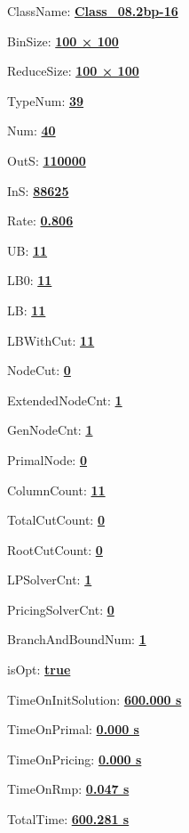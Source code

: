\documentclass[11pt]{article}
\begin{document}
\pagestyle{empty}


ClassName: \underline{\textbf{Class_08.2bp-16}}
\par
BinSize: \underline{\textbf{100 × 100}}
\par
ReduceSize: \underline{\textbf{100 × 100}}
\par
TypeNum: \underline{\textbf{39}}
\par
Num: \underline{\textbf{40}}
\par
OutS: \underline{\textbf{110000}}
\par
InS: \underline{\textbf{88625}}
\par
Rate: \underline{\textbf{0.806}}
\par
UB: \underline{\textbf{11}}
\par
LB0: \underline{\textbf{11}}
\par
LB: \underline{\textbf{11}}
\par
LBWithCut: \underline{\textbf{11}}
\par
NodeCut: \underline{\textbf{0}}
\par
ExtendedNodeCnt: \underline{\textbf{1}}
\par
GenNodeCnt: \underline{\textbf{1}}
\par
PrimalNode: \underline{\textbf{0}}
\par
ColumnCount: \underline{\textbf{11}}
\par
TotalCutCount: \underline{\textbf{0}}
\par
RootCutCount: \underline{\textbf{0}}
\par
LPSolverCnt: \underline{\textbf{1}}
\par
PricingSolverCnt: \underline{\textbf{0}}
\par
BranchAndBoundNum: \underline{\textbf{1}}
\par
isOpt: \underline{\textbf{true}}
\par
TimeOnInitSolution: \underline{\textbf{600.000 s}}
\par
TimeOnPrimal: \underline{\textbf{0.000 s}}
\par
TimeOnPricing: \underline{\textbf{0.000 s}}
\par
TimeOnRmp: \underline{\textbf{0.047 s}}
\par
TotalTime: \underline{\textbf{600.281 s}}
\par
\newpage


\end{document}
